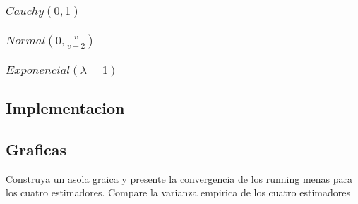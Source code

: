 \documentclass{article}
\begin{document}
\subsubsection{$Cauchy(0,1)$}
\subsubsection{$Normal(0, \frac{v}{v-2})$}
\subsubsection{$Exponencial(\lambda=1)$}

\subsection{Implementacion}

\subsection{Graficas}
Construya un asola graica y presente la convergencia de los running menas para los cuatro estimadores. Compare la varianza empirica de los
cuatro estimadores
\end{document}
